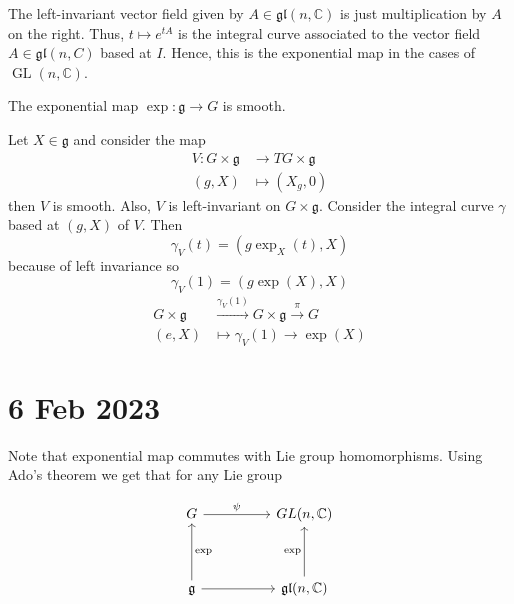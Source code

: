\documentclass[11pt,a4paper]{scrarticle}
\theoremstyle{definition}
\renewenvironment{proof}[1][\proofname]{\vspace{-10pt}\begin{myproof}}{\end{myproof}}
\theoremstyle{greenbox}
\newcommand{\C}{\mathbb{C}}
\newcommand{\fg}{\mathfrak{g}}
\begin{document}
The left-invariant vector field given by $ A \in \mathfrak{gl}(n,\C) $ is just  multiplication by $ A $ on the right. Thus, $ t \mapsto e^{tA} $ is the integral curve associated to the vector field $ A \in \mathfrak{gl}(n,C) $ based at $ I $. Hence, this is the exponential map in the cases of $ \operatorname{GL}(n,\C) $.

\begin{thm}
    The exponential map $ \exp : \mathfrak{g} \to G $ is smooth.
\end{thm}
\begin{proof}
    Let $ X \in \mathfrak{g} $ and consider the map \begin{align*}
        V : G \times \fg & \to TG \times \fg \\
        (g,X) & \mapsto (X_{g},0)
    \end{align*}
    then $ V $ is smooth. Also, $ V $ is left-invariant on $ G \times \fg $. Consider the integral curve $ \gamma  $ based at $ (g,X) $ of $ V $. Then 
    \[ \gamma_{V}(t) = (g \exp_{X}(t),X) \]
    because of left invariance so 
    \[ \gamma_{V}(1) = (g \exp(X),X) \]
    \begin{align*}
        G \times \fg & \xrightarrow{\gamma_{V}(1)} G \times \fg \xrightarrow{\pi} G \\
        (e,X) & \mapsto \gamma_{V}(1) \to \exp(X)
    \end{align*}
\end{proof}

\section{6 Feb 2023}

Note that exponential map commutes with Lie group homomorphisms. Using Ado's theorem we get that for any Lie group

\[\begin{tikzcd}[ampersand replacement=\&]
	G \&\& {GL(n,\mathbb{C})} \\
	\\
	{\mathfrak{g}} \&\& {\mathfrak{gl}(n,\mathbb{C})}
	\arrow[from=3-1, to=3-3]
	\arrow["\exp", from=3-3, to=1-3]
	\arrow["\exp"', from=3-1, to=1-1]
	\arrow["\psi", from=1-1, to=1-3]
\end{tikzcd}\]
\end{document}
